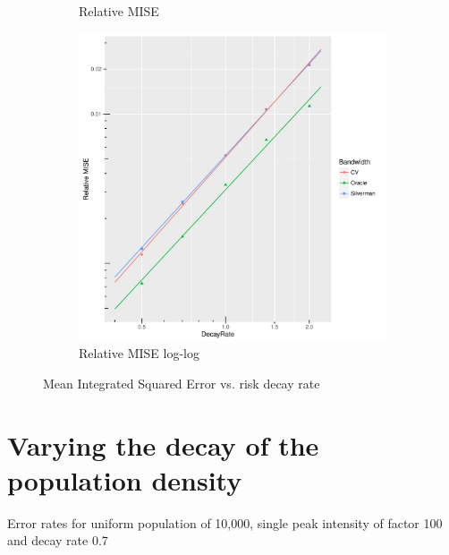 \begin{figure}[htbp]
\begin{subfigure}[b]{0.3\textwidth}
    \caption{Relative MISE}
    \end{subfigure}
    \begin{subfigure}[b]{0.3\textwidth}
    \includegraphics[width=\textwidth]{results/by_cases_decay/RMISE-vs-risk-decay-log-log}
    \caption{Relative MISE log-log}
    \end{subfigure}
    \caption[MISE: by risk decay]{Mean Integrated Squared Error vs. risk decay rate}
    \label{fig:ise:unif_100_SD}
\end{figure}

\section{Varying the decay of the population density}
\label{sec:results:pSD_100_1h}

\begin{table}[htbp]
\centering

\caption{Error rates for uniform population of 10,000, single peak intensity of factor 100 and decay rate 0.7}
\label{tbl:results:p0.7_100_1_1h}
\end{table}


